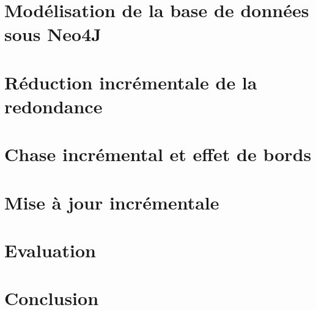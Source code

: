 \section{Modélisation de la base de données sous Neo4J}
\label{sec:update:db}


\section{Réduction incrémentale de la redondance}
\label{sec:update:simplify}


\section{Chase incrémental et effet de bords}
\label{sec:update:chase}


\section{Mise à jour incrémentale}
\label{sec:update:update}


\section{Evaluation}
\label{sec:update:evaluation}


\section{Conclusion}
\label{sec:update:conclusion}

